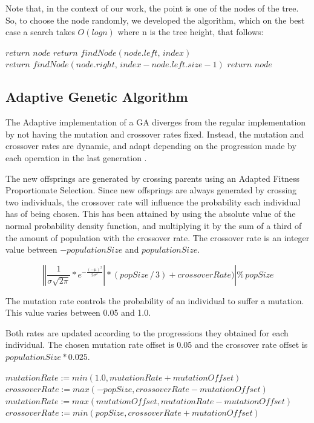 \documentclass[runningheads]{llncs}
\begin{document}
Note that, in the context of our work, the point is one of the nodes of the tree. So, to choose the node randomly, we developed the algorithm, which on the best case a search takes $O(log n)$ where n is the tree height,  that follows:
\begin{algorithmic}
        \State $return \,\, node$
\Else 
           \State $return \,\, findNode(node.left,\,index)$
           \State $return \,\, findNode(node.right,\,index - node.left.size - 1)$
       \Else
	 \State $return \,\, node$
       \EndIf
\EndIf
\end{algorithmic}

\subsection{Adaptive Genetic Algorithm}
The Adaptive implementation of a GA diverges from the regular implementation by not having the mutation and crossover rates fixed. Instead, the mutation and crossover rates are dynamic, and adapt depending on the progression made by each operation in the last generation \cite{adaptativeCrossOverMutation}.

The new offsprings are generated by crossing parents using an Adapted Fitness Proportionate Selection. Since new offsprings are always generated by crossing two individuals, the crossover rate will influence the probability each individual has of being chosen. This has been attained by using the absolute value of the normal probability density function, and multiplying it by the sum of a third of the amount of population with the crossover rate. The crossover rate is an integer value between \(-populationSize\) and \(populationSize\).

\[ \left |\left | \frac{1}{\sigma \sqrt{2\pi}}*e^{-\frac{(-\mu)^2}{2\sigma^2}} \right | * (popSize\,/\,3) + crossoverRate)  \right | \%  \, popSize \]	

The mutation rate controls the probability of an individual to suffer a mutation. This value varies between 0.05 and 1.0.

Both rates are updated according to the progressions they obtained for each individual. The chosen mutation rate offset is 0.05 and the crossover rate offset is \(populationSize * 0.025\).

\begin{algorithmic}
        \State $mutationRate := min(1.0, mutationRate + mutationOffset)$
        \State $crossoverRate := max(-popSize, crossoverRate - mutationOffset)$
\EndIf
{}
        \State $mutationRate := max(mutationOffset, mutationRate - mutationOffset)$
        \State $crossoverRate := min(popSize, crossoverRate + mutationOffset)$
\EndIf
\end{algorithmic}
\end{document}

